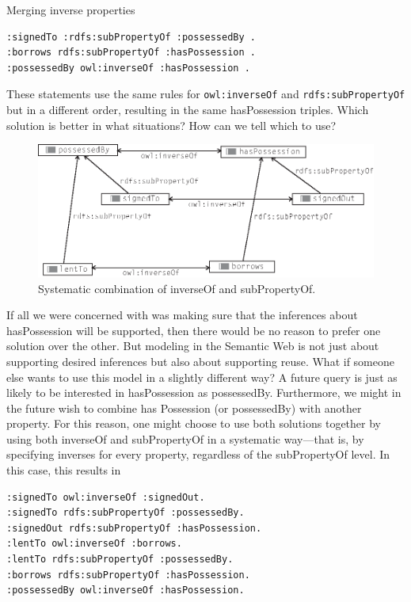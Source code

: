 \begin{challenge}{Merging inverse properties}
\begin{lstlisting}
:signedTo :rdfs:subPropertyOf :possessedBy .
:borrows rdfs:subPropertyOf :hasPossession .
:possessedBy owl:inverseOf :hasPossession .
\end{lstlisting}

These statements use the same rules for \texttt{owl:inverseOf} and
\texttt{rdfs:subPropertyOf} but in a different order, resulting in the same
hasPossession triples. Which solution is better in what situations? How
can we tell which to use?



\begin{figure}
\centering
\includegraphics[width=5in]{media/ch9/f09-002.eps}
\caption{Systematic combination of inverseOf and subPropertyOf.}
\label{fig:ch9.2}
\end{figure}


If all we were concerned with was making sure that the inferences about
hasPossession will be supported, then there would be no reason to prefer
one solution over the other. But modeling in the Semantic Web is not
just about supporting desired inferences but also about supporting
reuse. What if someone else
wants to use this model in a slightly different way? A future query is
just as likely to be interested in hasPossession as possessedBy.
Furthermore, we might in the future wish to combine has Possession (or
possessedBy) with another property. For this reason, one might choose to
use both solutions together by using both inverseOf and subPropertyOf in
a systematic way---that is, by specifying inverses for every property,
regardless of the subPropertyOf level. In this case, this results in

\begin{lstlisting}
:signedTo owl:inverseOf :signedOut.
:signedTo rdfs:subPropertyOf :possessedBy.
:signedOut rdfs:subPropertyOf :hasPossession.
:lentTo owl:inverseOf :borrows.
:lentTo rdfs:subPropertyOf :possessedBy.
:borrows rdfs:subPropertyOf :hasPossession.
:possessedBy owl:inverseOf :hasPossession.
\end{lstlisting}


\end{challenge}
